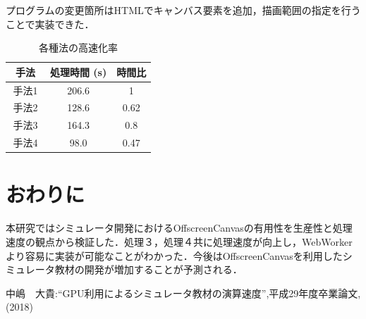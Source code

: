 \documentclass[twocolumn,10pt,a4j]{jsarticle}
\begin{document}
プログラムの変更箇所はHTMLでキャンバス要素を追加，描画範囲の指定を行うことで実装できた．

\begin{table} [htbp]
\vspace{6pt}
\centering
\caption{各種法の高速化率}
\vspace{4pt}
	\begin{tabular} {| c | c | c | } \hline
	手法　& 処理時間  (s)  & 時間比 \\ \hline
	手法1 & 206.6 & 1 \\ \hline 
	手法2 & 128.6 & 0.62 \\ \hline
	手法3 & 164.3 & 0.8 \\ \hline
	手法4 & 98.0 & 0.47 \\ \hline
	\end{tabular} 
	\label{tab:tab2}
\end{table}

\section{おわりに}
本研究ではシミュレータ開発におけるOffscreenCanvasの有用性を生産性と処理速度の観点から検証した．処理３，処理４共に処理速度が向上し，WebWorkerより容易に実装が可能なことがわかった．今後はOffscreenCanvasを利用したシミュレータ教材の開発が増加することが予測される．
\begin{thebibliography}{99}

	中嶋　大貴:``GPU利用によるシミュレータ教材の演算速度'',平成29年度卒業論文,(2018)
\end{thebibliography}
\end{document}
